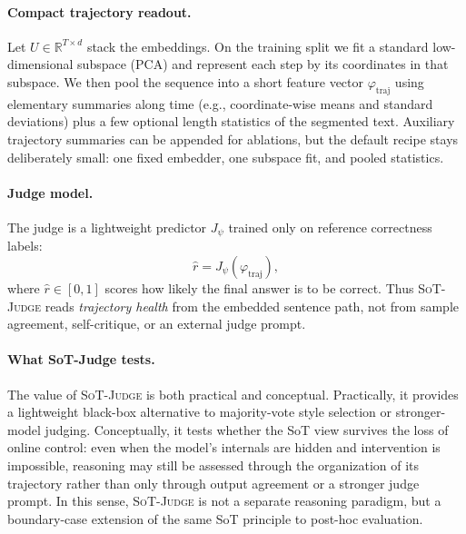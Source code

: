 \paragraph{Compact trajectory readout.}
Let \(U\in\mathbb{R}^{T\times d}\) stack the embeddings. 
On the training split we fit a standard low-dimensional subspace (PCA) and represent each step by its coordinates in that subspace. 
We then pool the sequence into a short feature vector \(\varphi_{\mathrm{traj}}\) using elementary summaries along time (e.g., coordinate-wise means and standard deviations) plus a few optional length statistics of the segmented text. 
Auxiliary trajectory summaries can be appended for ablations, but the default recipe stays deliberately small: one fixed embedder, one subspace fit, and pooled statistics.

\paragraph{Judge model.}
The judge is a lightweight predictor \(J_{\psi}\) trained only on reference correctness labels:
\begin{equation}
\hat r = J_{\psi}\!\left(\varphi_{\mathrm{traj}}\right),
\label{eq:app_judge}
\end{equation}
where \(\hat r\in[0,1]\) scores how likely the final answer is to be correct. 
Thus \textsc{SoT-Judge} reads \emph{trajectory health} from the embedded sentence path, not from sample agreement, self-critique, or an external judge prompt.

\paragraph{What SoT-Judge tests.}
The value of \textsc{SoT-Judge} is both practical and conceptual. 
Practically, it provides a lightweight black-box alternative to majority-vote style selection or stronger-model judging. 
Conceptually, it tests whether the SoT view survives the loss of online control: even when the model's internals are hidden and intervention is impossible, reasoning may still be assessed through the organization of its trajectory rather than only through output agreement or a stronger judge prompt. 
In this sense, \textsc{SoT-Judge} is not a separate reasoning paradigm, but a boundary-case extension of the same SoT principle to post-hoc evaluation.

\clearpage
{}

